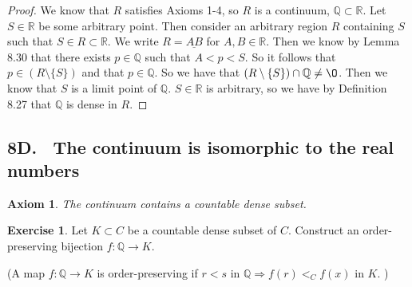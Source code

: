 \documentclass[12pt]{article}
\newcommand{\bbQ}{\mathbb{Q}}
\newcommand{\bbR}{\mathbb{R}}
\renewcommand{\emptyset}{\O}
\renewcommand{\_}[1]{\underline{ #1 }}
\newtheorem{axiom}{Axiom}
\theoremstyle{definition}
\newtheorem{exercise}[theorem]{Exercise}
\numberwithin{equation}{subsection}
\begin{document}
\begin{proof}
We know that $R$ satisfies Axioms 1-4, so $R$ is a continuum, $\bbQ \subset \bbR$. Let $S \in \bbR$ be some arbitrary point. Then consider an arbitrary region $R$ containing $S$ such that $S \in R \subset \bbR$. We write $R = \_{AB}$ for $A,B \in \bbR$. Then we know by Lemma 8.30 that there exists $p \in \bbQ$ such that $A < p < S$. So it follows that $p \in (R \setminus \{S\})$ and that $p \in \bbQ$. So we have that $(R \setminus \{S\}) \cap \bbQ \not = \emptyset$. Then we know that $S$ is a limit point of $\bbQ$. $S \in \bbR$ is arbitrary, so we have by Definition 8.27 that $\bbQ$ is dense in $R$.
\end{proof}



\subsection*{8D. \ The continuum is isomorphic to the real numbers}

\begin{axiom} The continuum contains a countable dense subset.
\end{axiom}

\begin{exercise} Let $K\subset C$ be a countable dense subset of $C.$ Construct an order-preserving bijection $f:\bbQ\longrightarrow K.$ 

(A map $f:\bbQ\longrightarrow K$ is order-preserving if $r<s$ in $\bbQ\Longrightarrow f(r)<_C f(x)$ in $K.$ )
\end{exercise}
\end{document}
